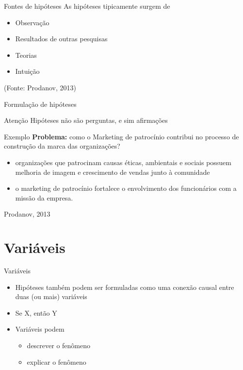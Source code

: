 \documentclass{beamer}
\begin{document}
\begin{frame}{Fontes de hipóteses}
  As hipóteses tipicamente surgem de
  \bigskip
  \begin{itemize}
    \footnotesize
  \item Observação
    \medskip
  \item Resultados de outras pesquisas
    \medskip
  \item Teorias
    \medskip
  \item Intuição
  \end{itemize}

  \vfill
  \scriptsize
  \hfill (Fonte: Prodanov, 2013)
\end{frame}

\begin{frame}{Formulação de hipóteses}
  \begin{block}{Atenção}
    Hipóteses não são perguntas, e sim afirmações
  \end{block}

  \begin{exampleblock}{Exemplo}
    \footnotesize
    {\bf Problema:} como o Marketing de patrocínio
    contribui no processo de construção da marca das organizações?

    \begin{itemize}
      \scriptsize
    \item organizações que patrocinam causas éticas, ambientais e
      sociais possuem melhoria de imagem e crescimento de vendas junto
      à comunidade
    \item o marketing de patrocínio fortalece o envolvimento dos
      funcionários com a missão da empresa.
    \end{itemize}

    \vfill
    \scriptsize
    \hfill Prodanov, 2013
\end{exampleblock}
\end{frame}

\section{Variáveis}

\begin{frame}{Variáveis}
  \begin{itemize}
    \footnotesize
  \item Hipóteses também podem ser formuladas como uma conexão causal
    entre duas (ou mais) variáveis
    \bigskip
  \item Se X, então Y
    \bigskip
  \item Variáveis podem
    \begin{itemize}
      \scriptsize
    \item descrever o fenômeno
    \item explicar o fenômeno
    \end{itemize}
  \end{itemize}
\end{frame}
\end{document}
